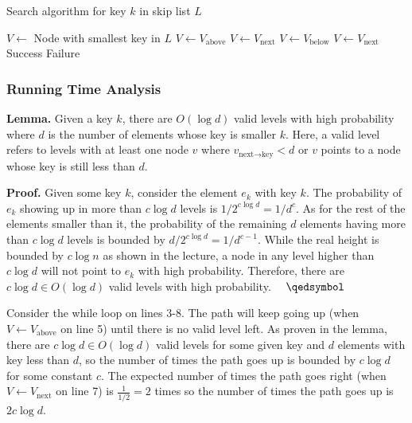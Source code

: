 \begin{algorithm}
\caption{Search algorithm for key $k$ in skip list $L$}
\begin{algorithmic}[1]
	\State $V \gets$ Node with smallest key in $L$
	 
			\State $V \gets V_\text{above}$
		\EndWhile
		\State $V \gets V_\text{next}$
	\EndWhile
	 
		\State $V \gets V_\text{below}$
			\State $V \gets V_\text{next}$
		\EndWhile
	\EndWhile
		\State \Return Success
	\Else
		\State \Return Failure
	\EndIf
\EndProcedure
\end{algorithmic}
\end{algorithm}

\subsubsection{Running Time Analysis}

\begin{tcolorbox}
\textbf{Lemma.} Given a key $k$, there are $O(\log d)$ valid levels with high probability where $d$ is the number of elements whose key is smaller $k$.
Here, a valid level refers to levels with at least one node $v$ where $v_\text{next$\to$key} < d$ or $v$ points to a node whose key is still less than $d$.

\textbf{Proof.} Given some key $k$, consider the element $e_k$ with key $k$. The probability of $e_k$ showing up in more than $c\log d$ levels is $1/2^{c\log d} = 1/d^c$.
As for the rest of the elements smaller than it, the probability of the remaining $d$ elements having more than $c\log d$ levels is bounded by $d/2^{c\log d} = 1/d^{c-1}$.
While the real height is bounded by $c\log n$ as shown in the lecture, a node in any level higher than $c\log d$ will not point to $e_k$ with high probability.
Therefore, there are $c\log d \in O(\log d)$ valid levels with high probability. $\quad\qedsymbol$
\end{tcolorbox}

Consider the while loop on lines 3-8. The path will keep going up (when $V\gets V_\text{above}$ on line 5) until there is no valid level left.
As proven in the lemma, there are $c\log d \in O(\log d)$ valid levels for some given key and $d$ elements with key less than $d$, so the number of times the path goes up is bounded by $c\log d$ for some constant $c$.
The expected number of times the path goes right (when $V \gets V_\text{next}$ on line 7) is $\frac{1}{1/2} = 2$ times so the number of times the path goes up is $2c\log d$.

